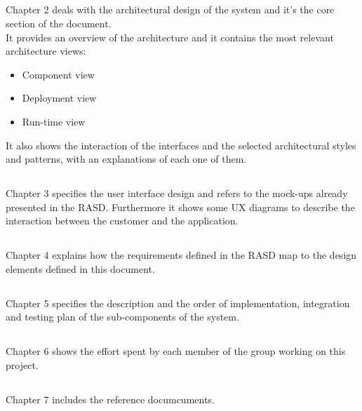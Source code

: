         \subsection*{}
        Chapter 2 deals with the architectural design of the system and it's the
        core section of the document. \\
        It provides an overview of the architecture and it contains the most
        relevant architecture views:
        \begin{itemize}
            \item Component view
            \item Deployment view
            \item Run-time view
        \end{itemize}
        It also shows the interaction of the interfaces and the selected
        architectural styles and patterns, with an explanations of each one of
        them.
                
        \subsection*{}
        Chapter 3 specifies the user interface design and refers to the mock-ups
        already presented in the RASD. Furthermore it shows some UX diagrams to
        describe the interaction between the customer and the application.

        \subsection*{}
        Chapter 4 explains how the requirements defined in the RASD map to the
        design elements defined in this document.

        \subsection*{}
        Chapter 5 specifies the description and the order of implementation,
        integration and testing plan of the sub-components of the system.
        
        \subsection*{}
        Chapter 6 shows the effort spent by each member of the group working on
        this project.
    
        \subsection*{}
        Chapter 7 includes the reference documcuments.
        
